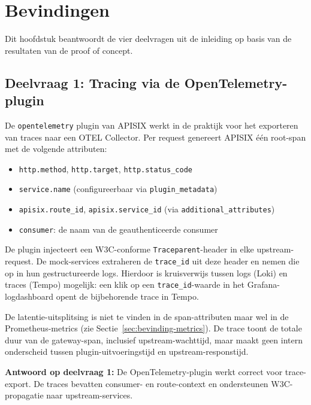 
\chapter{Bevindingen}%
\label{ch:bevindingen}

Dit hoofdstuk beantwoordt de vier deelvragen uit de inleiding op basis van de resultaten van de proof of concept.

\section{Deelvraag 1: Tracing via de OpenTelemetry-plugin}%
\label{sec:bevinding-tracing}

De \texttt{opentelemetry} plugin van APISIX werkt in de praktijk voor het exporteren van traces naar een OTEL Collector. Per request genereert APISIX één root-span met de volgende attributen:

\begin{itemize}
  \item \texttt{http.method}, \texttt{http.target}, \texttt{http.status\_code}
  \item \texttt{service.name} (configureerbaar via \texttt{plugin\_metadata})
  \item \texttt{apisix.route\_id}, \texttt{apisix.service\_id} (via \texttt{additional\_attributes})
  \item \texttt{consumer}: de naam van de geauthenticeerde consumer
\end{itemize}

De plugin injecteert een W3C-conforme \texttt{Traceparent}-header in elke upstream-request. De mock-services extraheren de \texttt{trace\_id} uit deze header en nemen die op in hun gestructureerde logs. Hierdoor is kruisverwijs tussen logs (Loki) en traces (Tempo) mogelijk: een klik op een \texttt{trace\_id}-waarde in het Grafana-logdashboard opent de bijbehorende trace in Tempo.

De latentie-uitsplitsing is niet te vinden in de span-attributen maar wel in de Prometheus-metrics (zie Sectie~\ref{sec:bevinding-metrics}). De trace toont de totale duur van de gateway-span, inclusief upstream-wachttijd, maar maakt geen intern onderscheid tussen plugin-uitvoeringstijd en upstream-responstijd.

\textbf{Antwoord op deelvraag 1:} De OpenTelemetry-plugin werkt correct voor trace-export. De traces bevatten consumer- en route-context en ondersteunen W3C-propagatie naar upstream-services.

